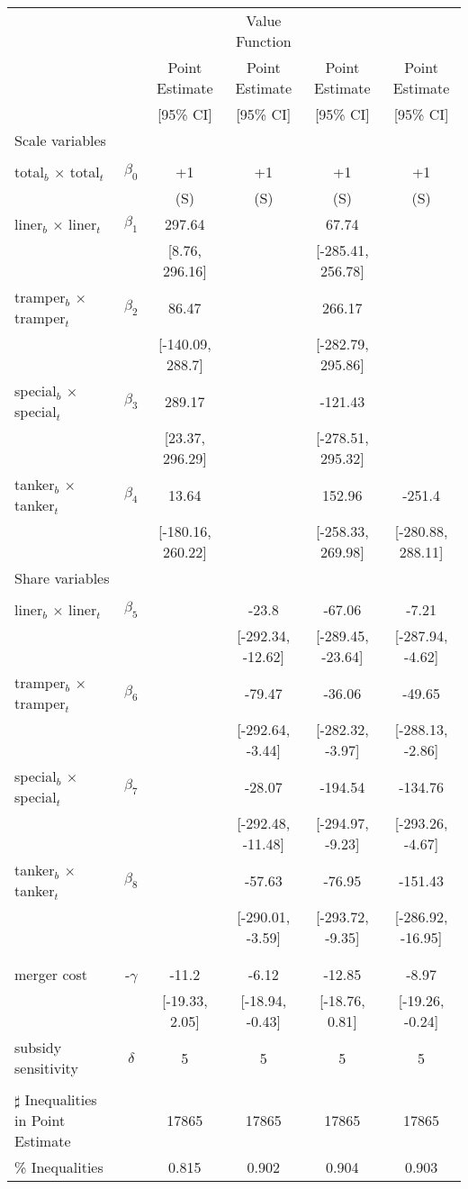 \begin{tabular}{@{\extracolsep{5pt}}lccccc}
\toprule 
 &  &  & Value Function &  &  \\
 &  & Point Estimate & Point Estimate & Point Estimate & Point Estimate \\
 &  & [95\% CI] & [95\% CI] & [95\% CI] & [95\% CI] \\
\midrule 
Scale variables &  &  &  &  &  \\
 &  &  &  &  \\
total$_{b}$ $\times$ total$_{t}$ & $\beta_0$ & +1 & +1 & +1 & +1 \\
 &  & (S) & (S) & (S) & (S) \\
liner$_{b}$ $\times$ liner$_{t}$ & $\beta_1$ & 297.64 &  & 67.74 &  \\
 &  & [8.76, 296.16] &  & [-285.41, 256.78] &  \\
tramper$_{b}$ $\times$ tramper$_{t}$ & $\beta_2$ & 86.47 &  & 266.17 &  \\
 &  & [-140.09, 288.7] &  & [-282.79, 295.86] &  \\
special$_{b}$ $\times$ special$_{t}$ & $\beta_3$ & 289.17 &  & -121.43 &  \\
 &  & [23.37, 296.29] &  & [-278.51, 295.32] &  \\
tanker$_{b}$ $\times$ tanker$_{t}$ & $\beta_4$ & 13.64 &  & 152.96 & -251.4 \\
 &  & [-180.16, 260.22] &  & [-258.33, 269.98] & [-280.88, 288.11] \\
Share variables &  &  &  &  &  \\
 &  &  &  &  &  \\
liner$_{b}$ $\times$ liner$_{t}$ & $\beta_5$ &  & -23.8 & -67.06 & -7.21 \\
 &  &  & [-292.34, -12.62] & [-289.45, -23.64] & [-287.94, -4.62] \\
tramper$_{b}$ $\times$ tramper$_{t}$ & $\beta_6$ &  & -79.47 & -36.06 & -49.65 \\
 &  &  & [-292.64, -3.44] & [-282.32, -3.97] & [-288.13, -2.86] \\
special$_{b}$ $\times$ special$_{t}$ & $\beta_7$ &  & -28.07 & -194.54 & -134.76 \\
 &  &  & [-292.48, -11.48] & [-294.97, -9.23] & [-293.26, -4.67] \\
tanker$_{b}$ $\times$ tanker$_{t}$ & $\beta_8$ &  & -57.63 & -76.95 & -151.43 \\
 &  &  & [-290.01, -3.59] & [-293.72, -9.35] & [-286.92, -16.95] \\
 &  &  &  &  &  \\
 &  &  &  &  &  \\
merger cost & -$\gamma$ & -11.2 & -6.12 & -12.85 & -8.97 \\
 &  & [-19.33, 2.05] & [-18.94, -0.43] & [-18.76, 0.81] & [-19.26, -0.24] \\
subsidy sensitivity & $\delta$ & 5 & 5 & 5 & 5 \\
 &  &  &  &  &  \\
\hline 
$\sharp$ Inequalities in Point Estimate &  & 17865 & 17865 & 17865 & 17865 \\
\% Inequalities &  & 0.815 & 0.902 & 0.904 & 0.903 \\
\bottomrule 
\end{tabular}
